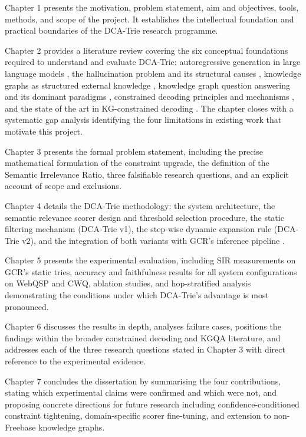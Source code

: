 Chapter 1 presents the motivation, problem statement, aim and objectives, tools, methods, and scope of the project. It establishes the intellectual foundation and practical boundaries of the DCA-Trie research programme.

Chapter 2 provides a literature review covering the six conceptual foundations required to understand and evaluate DCA-Trie: autoregressive generation in large language models \citep{brown2020gpt3,dubey2024llama}, the hallucination problem and its structural causes \citep{ji2023survey,huang2023survey}, knowledge graphs as structured external knowledge \citep{bollacker2008freebase}, knowledge graph question answering and its dominant paradigms \citep{lan2022survey,lewis2020retrieval}, constrained decoding principles and mechanisms \citep{geng2023gcd,willard2023outlines}, and the state of the art in KG-constrained decoding \citep{luo2024gcr,li2024dog}. The chapter closes with a systematic gap analysis identifying the four limitations in existing work that motivate this project.

Chapter 3 presents the formal problem statement, including the precise mathematical formulation of the constraint upgrade, the definition of the Semantic Irrelevance Ratio, three falsifiable research questions, and an explicit account of scope and exclusions.

Chapter 4 details the DCA-Trie methodology: the system architecture, the semantic relevance scorer design and threshold selection procedure, the static filtering mechanism (DCA-Trie v1), the step-wise dynamic expansion rule (DCA-Trie v2), and the integration of both variants with GCR's inference pipeline \citep{luo2024gcr}.

Chapter 5 presents the experimental evaluation, including SIR measurements on GCR's static tries, accuracy and faithfulness results for all system configurations on WebQSP and CWQ, ablation studies, and hop-stratified analysis demonstrating the conditions under which DCA-Trie's advantage is most pronounced.

Chapter 6 discusses the results in depth, analyses failure cases, positions the findings within the broader constrained decoding and KGQA literature, and addresses each of the three research questions stated in Chapter 3 with direct reference to the experimental evidence.

Chapter 7 concludes the dissertation by summarising the four contributions, stating which experimental claims were confirmed and which were not, and proposing concrete directions for future research including confidence-conditioned constraint tightening, domain-specific scorer fine-tuning, and extension to non-Freebase knowledge graphs.
